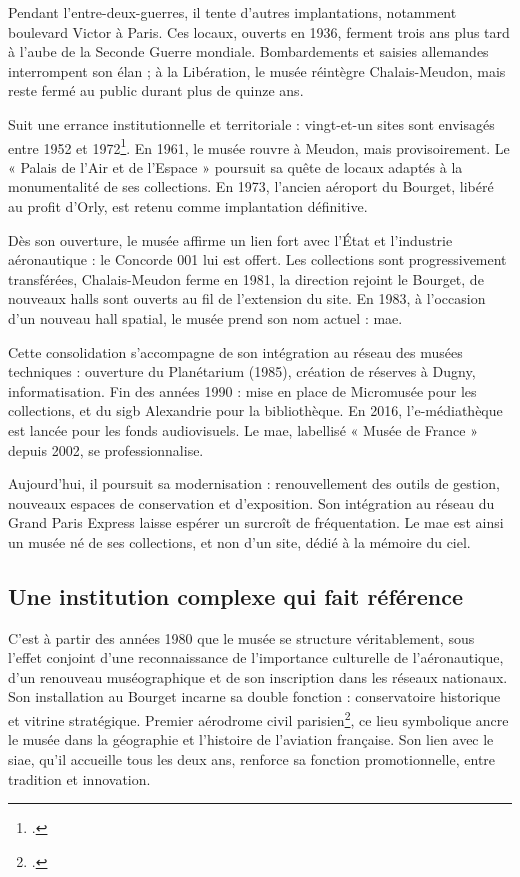 Pendant l’entre-deux-guerres, il tente d’autres implantations, notamment boulevard Victor à Paris. Ces locaux, ouverts en 1936, ferment trois ans plus tard à l’aube de la Seconde Guerre mondiale. Bombardements et saisies allemandes interrompent son élan ; à la Libération, le musée réintègre Chalais-Meudon, mais reste fermé au public durant plus de quinze ans.

Suit une errance institutionnelle et territoriale : vingt-et-un sites sont envisagés entre 1952 et 1972\footcite{terrierAeroportParisBourget2019}. En 1961, le musée rouvre à Meudon, mais provisoirement. Le « Palais de l’Air et de l’Espace » poursuit sa quête de locaux adaptés à la monumentalité de ses collections. En 1973, l’ancien aéroport du Bourget, libéré au profit d’Orly, est retenu comme implantation définitive.

Dès son ouverture, le musée affirme un lien fort avec l’État et l’industrie aéronautique : le Concorde 001 lui est offert. Les collections sont progressivement transférées, Chalais-Meudon ferme en 1981, la direction rejoint le Bourget, de nouveaux halls sont ouverts au fil de l’extension du site. En 1983, à l’occasion d’un nouveau hall spatial, le musée prend son nom actuel : \acf{mae}.

Cette consolidation s’accompagne de son intégration au réseau des musées techniques : ouverture du Planétarium (1985), création de réserves à Dugny, informatisation. Fin des années 1990 : mise en place de Micromusée pour les collections, et du \ac{sigb} Alexandrie pour la bibliothèque. En 2016, l’e-médiathèque est lancée pour les fonds audiovisuels. Le \ac{mae}, labellisé « Musée de France » depuis 2002, se professionnalise.

Aujourd’hui, il poursuit sa modernisation : renouvellement des outils de gestion, nouveaux espaces de conservation et d’exposition. Son intégration au réseau du Grand Paris Express laisse espérer un surcroît de fréquentation. Le \ac{mae} est ainsi un musée né de ses collections, et non d’un site, dédié à la mémoire du ciel.

\subsection{Une institution complexe qui fait référence}

C’est à partir des années 1980 que le musée se structure véritablement, sous l’effet conjoint d’une reconnaissance de l’importance culturelle de l’aéronautique, d’un renouveau muséographique et de son inscription dans les réseaux nationaux. Son installation au Bourget incarne sa double fonction : conservatoire historique et vitrine stratégique. Premier aérodrome civil parisien\footcite{terrierAeroportParisBourget2019}, ce lieu symbolique ancre le musée dans la géographie et l’histoire de l’aviation française. Son lien avec le \ac{siae}, qu’il accueille tous les deux ans, renforce sa fonction promotionnelle, entre tradition et innovation.

